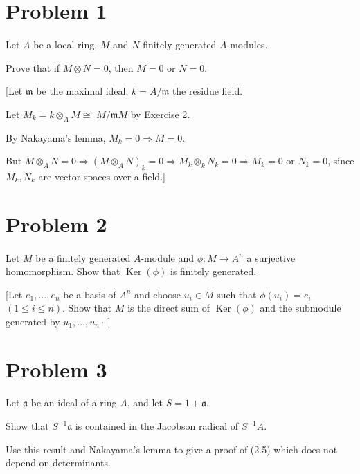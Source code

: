 \documentclass{article}
\begin{document}
\section*{Problem 1}\paragraph{}
Let $A$ be a local ring, $M$ and $N$ finitely generated $A$-modules.

Prove that if $M \otimes N=0$, then $M=0$ or $N=0$.

[Let $\mathfrak{m}$ be the maximal ideal, $k=A / \mathfrak{m}$ the residue field.

Let $M_k=k \otimes_A M \cong$ $M / \mathfrak{m} M$ by Exercise 2.

By Nakayama's lemma, $M_k=0 \Rightarrow M=0$.

But $M \otimes_A N=0 \Rightarrow\left(M \otimes_A N\right)_k=0 \Rightarrow M_k \otimes_k N_k=0 \Rightarrow M_k=0$ or $N_k=0$,
since $M_k, N_k$ are vector spaces over a field.]

\section*{Problem 2}\paragraph{}
Let $M$ be a finitely generated $A$-module and $\phi: M \rightarrow A^n$ a surjective homomorphism. Show that $\operatorname{Ker}(\phi)$ is finitely generated.

[Let $e_1, \ldots, e_n$ be a basis of $A^n$ and choose $u_i \in M$ such that $\phi\left(u_i\right)=e_i$ $(1 \leqslant i \leqslant n)$. Show that $M$ is the direct sum of $\operatorname{Ker}(\phi)$ and the submodule generated by $\left.u_1, \ldots, u_n \cdot\right]$

\section*{Problem 3}\paragraph{}
Let $\mathfrak{a}$ be an ideal of a ring $A$, and let $S=1+\mathfrak{a}$.

Show that $S^{-1} \mathfrak{a}$ is contained in the Jacobson radical of $S^{-1} A$.

Use this result and Nakayama's lemma to give a proof of (2.5) which does not depend on determinants.
\end{document}

